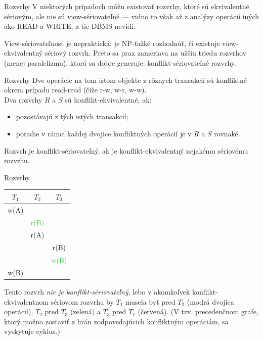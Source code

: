 \documentclass[12pt]{beamer}
\def\blue#1{\textcolor{Cerulean}{#1}}
\def\green#1{\textcolor{LimeGreen}{#1}}
\begin{document}
\begin{frame}[fragile]{Rozvrhy}
V niektorých prípadoch môžu existovať rozvrhy, ktoré sú ekvivalentné sériovým,
ale nie sú view-sériovateľné --- vidno to však až z analýzy operácií iných ako READ a WRITE, a tie DBMS nevidí.

View-sériovateľnosť je nepraktická: je NP-ťažké rozhodnúť, či existuje view-ekvivalentný sériový rozvrh.
Preto sa prax zameriava na užšiu triedu rozvrhov (menej paralelizmu),
ktorá sa dobre generuje: \alert{konflikt-sériovateľné} rozvrhy.
\end{frame}


\begin{frame}[fragile]{Rozvrhy}
Dve operácie na tom istom objekte z rôznych transakcií sú \alert{konfliktné} okrem prípadu read-read (čiže r-w, w-r, w-w).\\
Dva rozvrhy $R$ a $S$ sú \alert{konflikt-ekvivalentné}, ak:
\begin{itemize}
\item pozostávajú z tých istých transakcií;
\item poradie v rámci každej dvojice konfliktných operácií je v $R$ a $S$ rovnaké.
\end{itemize}
Rozvrh je \alert{konflikt-sériovateľný}, ak je konflikt-ekvivalentný nejakému sériovému rozvrhu.
\end{frame}


\begin{frame}[fragile]{Rozvrhy}
\begin{minipage}{.4\pdfpagewidth}
\begin{tabular}{c|c|c}
  $T_1$         & $T_2$         & $T_3$           \\\hline\hline
  \blue{w(A)}   &               &                 \\\hline
                & \green{r(B)}  &                 \\\hline
                & \blue{r(A)}   &                 \\\hline
                &               &  \alert{r(B)}   \\\hline
                &               &  \green{w(B)}   \\\hline
  \alert{w(B)}  &               &                 \\
\end{tabular}
\end{minipage}
\begin{minipage}{.4\pdfpagewidth}
Tento rozvrh \emph{nie je konflikt-sériovateľný}, lebo v akomkoľvek konflikt-ekvivalentnom sériovom rozvrhu
by $T_1$ musela byť pred $T_2$ (modrá dvojica operácií), $T_2$ pred $T_3$ (zelená) a $T_3$ pred $T_1$ (červená).
(V tzv. precedenčnom grafe, ktorý možno zostaviť z hrán zodpovedajúcich konfliktným operáciám, sa vyskytuje cyklus.)
\end{minipage}
\\[5mm]
\end{frame}
\end{document}
